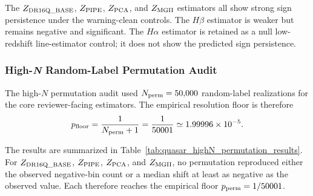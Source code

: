 \documentclass[11pt]{article}
\begin{document}
The \(Z_{\rm DR16Q\_BASE}\), \(Z_{\rm PIPE}\), \(Z_{\rm PCA}\), and \(Z_{\rm MGII}\) estimators all show strong sign persistence under the warning-clean controls. The \(H\beta\) estimator is weaker but remains negative and significant. The \(H\alpha\) estimator is retained as a null low-redshift line-estimator control; it does not show the predicted sign persistence.

\subsubsection{High-\textit{N} Random-Label Permutation Audit}

The high-\(N\) permutation audit used \(N_{\rm perm}=50{,}000\) random-label realizations for the core reviewer-facing estimators. The empirical resolution floor is therefore
\begin{equation}
p_{\rm floor}
=
\frac{1}{N_{\rm perm}+1}
=
\frac{1}{50001}
\simeq
1.99996\times10^{-5}.
\end{equation}

The results are summarized in Table~\ref{tab:quasar_highN_permutation_results}. For \(Z_{\rm DR16Q\_BASE}\), \(Z_{\rm PIPE}\), \(Z_{\rm PCA}\), and \(Z_{\rm MGII}\), no permutation reproduced either the observed negative-bin count or a median shift at least as negative as the observed value. Each therefore reaches the empirical floor \(p_{\rm perm}=1/50001\).
\end{document}
